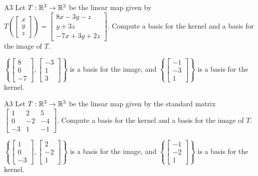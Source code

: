 \begin{problem}{A3}
Let $T: \mathbb{R}^3 \rightarrow \mathbb{R}^3$ be the linear map given by \(
  T\left(\begin{bmatrix} x \\ y \\ z \end{bmatrix} \right) =
  \begin{bmatrix}
    8x-3y-z \\
    y+3z \\
    -7x+3y+2z
  \end{bmatrix}
\). Compute a basis for the kernel and a basis for the image of $T$.
\end{problem}
\begin{solution}
\(\left\{
  \begin{bmatrix} 8 \\ 0 \\ -7 \end{bmatrix},
  \begin{bmatrix} -3 \\ 1 \\ 3 \end{bmatrix}
\right\} \) is a basis for the image, and \(\left\{
  \begin{bmatrix} -1 \\ -3 \\ 1 \end{bmatrix}
\right\} \) is a basis for the kernel.
\end{solution}


\begin{problem}{A3}
Let $T: \mathbb{R}^3 \rightarrow \mathbb{R}^3$ be the linear map given by the standard matrix
\(
  \begin{bmatrix}
    1 & 2 & 5 \\
    0 & -2 & -4 \\
    -3 & 1 & -1
  \end{bmatrix}
\). Compute a basis for the kernel and a basis for the image of $T$.
\end{problem}
\begin{solution}
\(\left\{
  \begin{bmatrix} 1 \\ 0 \\ -3 \end{bmatrix},
  \begin{bmatrix} 2 \\ -2 \\ 1 \end{bmatrix}
\right\} \) is a basis for the image, and \(\left\{
  \begin{bmatrix} -1 \\ -2 \\ 1 \end{bmatrix}
\right\} \) is a basis for the kernel.
\end{solution}


